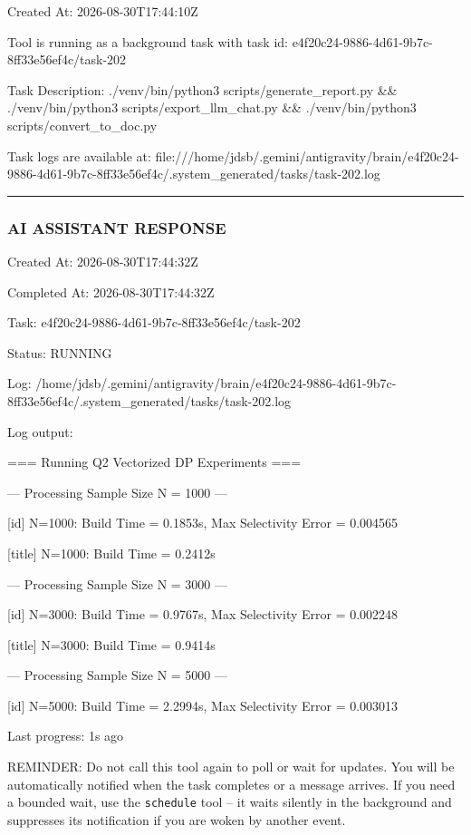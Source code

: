 \documentclass[11pt,a4paper]{article}
\begin{document}
{Created At: 2026-08-30T17:44:10Z

Tool is running as a background task with task id: e4f20c24-9886-4d61-9b7c-8ff33e56ef4c/task-202

Task Description: ./venv/bin/python3 scripts/generate\_report.py \&\& ./venv/bin/python3 scripts/export\_llm\_chat.py \&\& ./venv/bin/python3 scripts/convert\_to\_doc.py

Task logs are available at: file:///home/jdsb/.gemini/antigravity/brain/e4f20c24-9886-4d61-9b7c-8ff33e56ef4c/.system\_generated/tasks/task-202.log


\hrule

\subsubsection{AI ASSISTANT RESPONSE}

Created At: 2026-08-30T17:44:32Z

Completed At: 2026-08-30T17:44:32Z

Task: e4f20c24-9886-4d61-9b7c-8ff33e56ef4c/task-202

Status: RUNNING

Log: /home/jdsb/.gemini/antigravity/brain/e4f20c24-9886-4d61-9b7c-8ff33e56ef4c/.system\_generated/tasks/task-202.log

Log output:

=== Running Q2 Vectorized DP Experiments ===


--- Processing Sample Size N = 1000 ---

[id] N=1000: Build Time = 0.1853s, Max Selectivity Error = 0.004565

[title] N=1000: Build Time = 0.2412s


--- Processing Sample Size N = 3000 ---

[id] N=3000: Build Time = 0.9767s, Max Selectivity Error = 0.002248

[title] N=3000: Build Time = 0.9414s


--- Processing Sample Size N = 5000 ---

[id] N=5000: Build Time = 2.2994s, Max Selectivity Error = 0.003013


Last progress: 1s ago



REMINDER: Do not call this tool again to poll or wait for updates. You will be automatically notified when the task completes or a message arrives. If you need a bounded wait, use the \texttt{schedule} tool -- it waits silently in the background and suppresses its notification if you are woken by another event.


}
\end{document}
